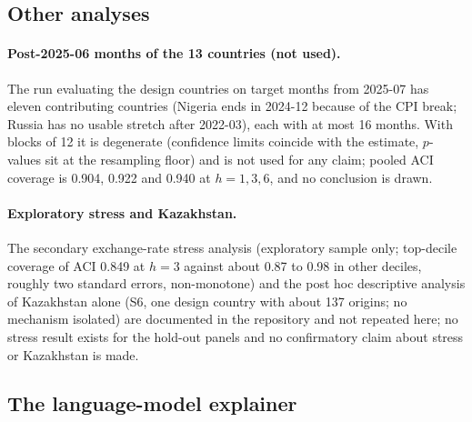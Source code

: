 \subsection{Other analyses}\label{sec:other}

\paragraph{Post-2025-06 months of the 13 countries (not used).} The run evaluating the design countries on target months from 2025-07 has eleven contributing countries (Nigeria ends in 2024-12 because of the CPI break; Russia has no usable stretch after 2022-03), each with at most 16 months. With blocks of 12 it is degenerate (confidence limits coincide with the estimate, $p$-values sit at the resampling floor) and is not used for any claim; pooled ACI coverage is 0.904, 0.922 and 0.940 at $h=1,3,6$, and no conclusion is drawn.

\paragraph{Exploratory stress and Kazakhstan.} The secondary exchange-rate stress analysis (exploratory sample only; top-decile coverage of ACI 0.849 at $h=3$ against about 0.87 to 0.98 in other deciles, roughly two standard errors, non-monotone) and the post hoc descriptive analysis of Kazakhstan alone (S6, one design country with about 137 origins; no mechanism isolated) are documented in the repository and not repeated here; no stress result exists for the hold-out panels and no confirmatory claim about stress or Kazakhstan is made.

\subsection{The language-model explainer}\label{sec:explainer}

